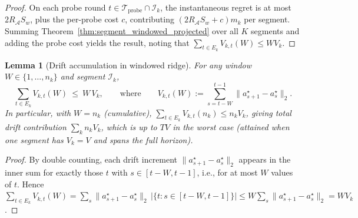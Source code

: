 \documentclass[11pt]{article}
\newcommand{\cA}{\mathcal{A}}
\newcommand{\cI}{\mathcal{I}}
\newcommand{\cTprobe}{\mathcal{T}_{\mathrm{probe}}}
\newtheorem{lemma}{Lemma}
\begin{document}
\begin{proof}
On each probe round $t\in\cTprobe\cap\cI_k$, the instantaneous regret is at most
$2R_{\cA}S_w$, plus the per-probe cost $c$, contributing $(2R_{\cA}S_w+c)m_k$ per
segment.
Summing Theorem~\ref{thm:segment_windowed_projected} over all $K$ segments and
adding the probe cost yields the result, noting that
$\sum_{t\in E_k}V_{k,t}(W)\le WV_k$.
\end{proof}

\begin{lemma}[Drift accumulation in windowed ridge]
\label{lem:drift_accumulation}
For any window $W\in\{1,\ldots,n_k\}$ and segment $\cI_k$,
\begin{equation}
  \sum_{t\in E_k}V_{k,t}(W)\ \le\ W\,V_k,
  \qquad\text{where}\qquad V_{k,t}(W):=\sum_{s=t-W}^{t-1}\|a_{s+1}^\star-a_s^\star\|_2.
  \label{eq:drift_accum}
\end{equation}
In particular, with $W=n_k$ (cumulative), $\sum_{t\in E_k}V_{k,t}(n_k)\le n_kV_k$,
giving total drift contribution $\sum_k n_kV_k$, which is up to $TV$ in the
worst case (attained when one segment has $V_k=V$ and spans the full horizon).
\end{lemma}

\begin{proof}
By double counting, each drift increment $\|a_{s+1}^\star-a_s^\star\|_2$ appears
in the inner sum for exactly those $t$ with $s\in[t-W,t-1]$, i.e., for at most
$W$ values of $t$.  Hence $\sum_{t\in E_k}V_{k,t}(W)=\sum_s\|a_{s+1}^\star-a_s^\star\|_2\,|\{t:s\in[t-W,t-1]\}|\le W\sum_s\|a_{s+1}^\star-a_s^\star\|_2=WV_k$.
\end{proof}
\end{document}
